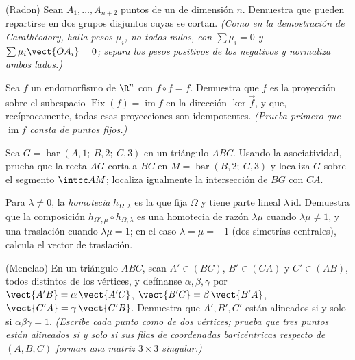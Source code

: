 \begin{exercise}[$\star\star\star$]\label{exo:b2:affine:7}
(Radon) Sean $A_1, \dots, A_{n+2}$ puntos de un  de
dimensión $n$. Demuestra que pueden repartirse en dos grupos
disjuntos cuyas  se cortan. \emph{(Como en la
demostración de Carathéodory, halla pesos $\mu_i$, no todos nulos,
con $\sum\mu_i = 0$ y $\sum\mu_i\vect{OA_i} = 0$; separa los pesos
positivos de los negativos y normaliza ambos lados.)}
\end{exercise}

\begin{exercise}[$\star\star\star$]\label{exo:b2:affine:8}
Sea $f$ un endomorfismo  de $\R^n$ con $f \circ f = f$.
Demuestra que $f$ es la proyección  sobre el subespacio 
$\operatorname{Fix}(f) = \operatorname{im} f$ en la dirección
$\ker\vec f$, y que, recíprocamente, todas esas proyecciones son
idempotentes. \emph{(Prueba primero que $\operatorname{im} f$ consta
de puntos fijos.)}
\end{exercise}

\begin{exercise}[$\star$]\label{exo:b2:affine:9}
Sea $G = \operatorname{bar}(A, 1;\ B, 2;\ C, 3)$ en un triángulo
$ABC$. Usando la asociatividad, prueba que la recta $AG$ corta a $BC$
en $M = \operatorname{bar}(B, 2;\ C, 3)$ y localiza $G$ sobre el
segmento $\intcc AM$; localiza igualmente la intersección de $BG$ con
$CA$.
\end{exercise}

\begin{exercise}[$\star\star$]\label{exo:b2:affine:10}
Para $\lambda \neq 0$, la \emph{homotecia} $h_{\Omega, \lambda}$ es
la  que fija $\Omega$ y tiene parte lineal
$\lambda\,\mathrm{id}$. Demuestra que la composición $h_{\Omega',
\mu} \circ h_{\Omega, \lambda}$ es una homotecia de razón
$\lambda\mu$ cuando $\lambda\mu \neq 1$, y una traslación cuando
$\lambda\mu = 1$; en el caso $\lambda = \mu = -1$ (dos simetrías
centrales), calcula el vector de traslación.
\end{exercise}

\begin{exercise}[$\star\star$]\label{exo:b2:affine:11}
(Menelao) En un triángulo $ABC$, sean $A' \in (BC)$, $B' \in (CA)$ y
$C' \in (AB)$, todos distintos de los vértices, y defínanse $\alpha,
\beta, \gamma$ por $\vect{A'B} = \alpha\,\vect{A'C}$, $\vect{B'C} =
\beta\,\vect{B'A}$, $\vect{C'A} = \gamma\,\vect{C'B}$. Demuestra que
$A', B', C'$ están alineados si y solo si $\alpha\beta\gamma = 1$.
\emph{(Escribe cada punto como  de dos vértices; prueba que
tres puntos están alineados si y solo si sus filas de coordenadas
baricéntricas respecto de $(A, B, C)$ forman una matriz $3 \times 3$
singular.)}
\end{exercise}

